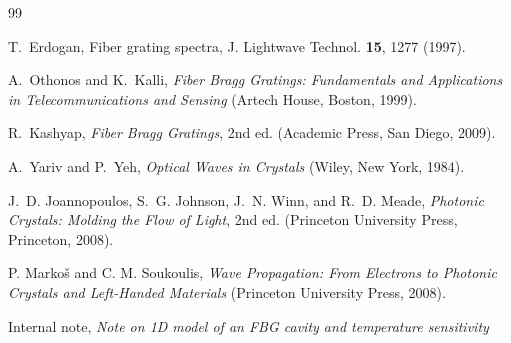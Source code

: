 \documentclass[aps,pra,twocolumn,superscriptaddress,nofootinbib]{revtex4-2}
\begin{document}
\begin{thebibliography}{99}


T.~Erdogan, Fiber grating spectra, J. Lightwave Technol. \textbf{15}, 1277 (1997).

A.~Othonos and K.~Kalli, \textit{Fiber Bragg Gratings: Fundamentals and Applications in Telecommunications and Sensing} (Artech House, Boston, 1999).

R.~Kashyap, \textit{Fiber Bragg Gratings}, 2nd ed. (Academic Press, San Diego, 2009).

A.~Yariv and P.~Yeh, \textit{Optical Waves in Crystals} (Wiley, New York, 1984).

J.~D. Joannopoulos, S.~G. Johnson, J.~N. Winn, and R.~D. Meade, \textit{Photonic Crystals: Molding the Flow of Light}, 2nd ed. (Princeton University Press, Princeton, 2008).

P. Markoš and C. M. Soukoulis,
\textit{Wave Propagation: From Electrons to Photonic Crystals and Left-Handed Materials}
(Princeton University Press, 2008).

Internal note, \textit{Note on 1D model of an FBG cavity and temperature sensitivity}
\end{thebibliography}
\end{document}
